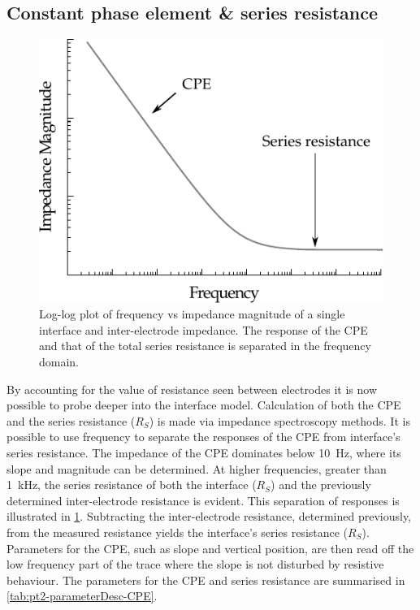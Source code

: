 

  \subsection{Constant phase element \& series resistance}


    \begin{figure}[h]
      \centering
      \includegraphics{content/pt2/07-InterfaceModel/graphics/graph_cpePlotGeneral}
      \caption{\label{fig:pt2-graph_cpePlotGeneral}Log-log plot of frequency vs impedance magnitude of a single interface and inter-electrode impedance. The response of the CPE and that of the total series resistance is separated in the frequency domain.}
    \end{figure}
    By accounting for the value of resistance seen between electrodes it is now possible to probe deeper into the interface model.
    Calculation of both the CPE and the series resistance ($R_S$) is made via impedance spectroscopy methods.
    It is possible to use frequency to separate the responses of the CPE from interface's series resistance.
    The impedance of the CPE dominates below \SI{10}{\hertz}, where its slope and magnitude can be determined.
    At higher frequencies, greater than \SI{1}{\kilo\hertz}, the series resistance of both the interface ($R_S$) and the previously determined inter-electrode resistance is evident.
    This separation of responses is illustrated in \cref{fig:pt2-graph_cpePlotGeneral}.
    Subtracting the inter-electrode resistance, determined previously, from the measured resistance yields the interface's series resistance ($R_S$).
    Parameters for the CPE, such as slope and vertical position, are then read off the low frequency part of the trace where the slope is not disturbed by resistive behaviour.
    The parameters for the CPE and series resistance are summarised in \cref{tab:pt2-parameterDesc-CPE}.


